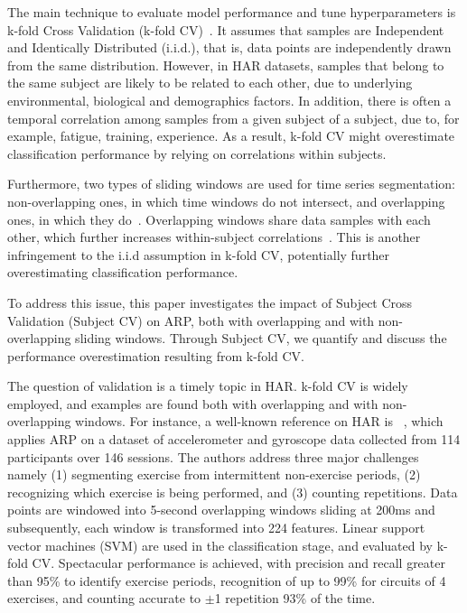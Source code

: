 \documentclass[sigconf]{acmart}
\begin{document}
The main technique to evaluate 
model performance and tune hyperparameters is k-fold Cross Validation (k-fold CV)~\cite{arlot2010survey}. It 
assumes that samples are Independent and Identically Distributed 
(i.i.d.), that is, data points are independently drawn from the same 
distribution. However, in HAR datasets, samples that belong to the same subject are likely to
be related to each other, due to underlying environmental, biological and demographics factors.
In addition, there is often a temporal correlation among samples from a given subject
of a subject, due to, for example, fatigue, training, experience. As a result, k-fold CV might overestimate classification performance by relying on correlations within 
subjects.

Furthermore, two types of sliding windows are used for time series segmentation: non-overlapping ones, in which time windows do not intersect, 
and overlapping ones, in which they do~\cite{lara2013survey}. Overlapping 
windows share data samples with each other, which further increases 
within-subject correlations~\cite{coggeshall2005asset}. This is another infringement to the i.i.d assumption in k-fold CV, potentially further overestimating
classification performance.    

To address this issue, this paper investigates the impact of  
Subject Cross Validation (Subject CV) on ARP, both with overlapping and 
with non-overlapping sliding windows. Through Subject CV, we quantify and discuss the performance overestimation resulting from k-fold CV. 

The question of validation is a timely topic in HAR. k-fold CV is 
widely employed, and examples are found both with overlapping and with 
non-overlapping windows. 
For instance, a well-known reference on HAR is 
~\cite{morris2014recofit}, which applies ARP on a dataset of 
accelerometer and gyroscope data collected from 114 participants over 
146 sessions. The authors address three major challenges namely (1) 
segmenting exercise from intermittent non-exercise periods, (2) 
recognizing which exercise is being performed, and (3) counting 
repetitions. Data points 
are windowed into 5-second overlapping windows sliding at 200ms and subsequently, 
each window is transformed into 224 features. Linear support vector 
machines (SVM) are used in the classification stage, and evaluated by 
k-fold CV. Spectacular performance is achieved, with precision and 
recall greater than 95\% to identify exercise periods, recognition 
of up to 99\% for circuits of 4 exercises, and counting  
accurate to $\pm$1 repetition 93\% of the time.
\end{document}
